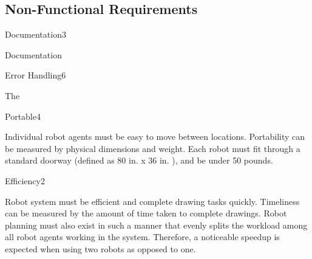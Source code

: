 \subsection{Non-Functional Requirements}
\label{sec:nonfunctional_requirements}

\begin{nonfunctional_requirement}{Documentation}{3}
\item Documentation
\end{nonfunctional_requirement}

\begin{nonfunctional_requirement}{Error Handling}{6}
\item The
\end{nonfunctional_requirement}

\begin{nonfunctional_requirement}{Portable}{4}
\item Individual robot agents must be easy to move between locations. Portability can be measured by physical dimensions and weight. Each robot must fit through a standard doorway (defined as 80 in. x 36 in. \cite{homedepotdoor}), and be under 50 pounds.
\end{nonfunctional_requirement}

\begin{nonfunctional_requirement}{Efficiency}{2}
\item Robot system must be efficient and complete drawing tasks quickly. Timeliness can be measured by the amount of time taken to complete drawings. Robot planning must also exist in such a manner that evenly splits the workload among all robot agents working in the system. Therefore, a noticeable speedup is expected when using two robots as opposed to one. 
\end{nonfunctional_requirement}

